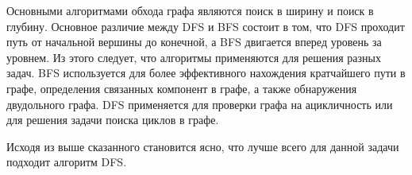 Основными алгоритмами обхода графа являются поиск в ширину и поиск в глубину. Основное различие между DFS и BFS состоит в том, что DFS проходит путь от начальной вершины до конечной, а BFS двигается вперед уровень за уровнем. Из этого следует, что алгоритмы применяются для решения разных задач. BFS используется для более эффективного нахождения кратчайшего пути в графе, определения связанных компонент в графе, а также обнаружения двудольного графа. DFS применяется для проверки графа на ацикличность или для решения задачи поиска циклов в графе.

Исходя из выше сказанного становится ясно, что лучше всего для данной задачи подходит алгоритм DFS.
\noteattributes{}
